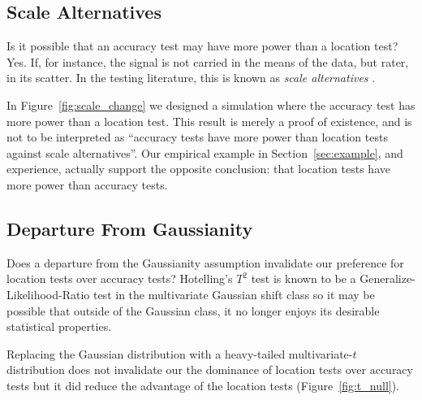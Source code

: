 \documentclass[12pt,a4paper]{article}
\begin{document}
\subsection{Scale Alternatives}
Is it possible that an accuracy test may have more power than a location test?
Yes. 
If, for instance, the signal is not carried in the means of the data, but rater, in its scatter. 
In the testing literature, this is known as \emph{scale alternatives} \cite[e.g.][and references therein]{ley2015high}.

In Figure~\ref{fig:scale_change} we designed a simulation where the accuracy test has more power than a location test. 
This result is merely a proof of existence, and is not to be interpreted as ``accuracy tests have more power than location tests against scale alternatives''.
Our empirical example in Section~\ref{sec:example}, and experience, actually support the opposite conclusion: that location tests have more power than accuracy tests. 


\subsection{Departure From Gaussianity}
Does a departure from the Gaussianity assumption invalidate our preference for location tests over accuracy tests? 
Hotelling's $T^2$ test is known to be a Generalize-Likelihood-Ratio test in the multivariate Gaussian shift class so it may be possible that outside of the Gaussian class, it no longer enjoys its desirable statistical properties. 

Replacing the Gaussian distribution with a heavy-tailed multivariate-$t$ distribution does not invalidate our the dominance of location tests over accuracy tests but it did reduce the advantage of the location tests (Figure~\ref{fig:t_null}).
\end{document}
